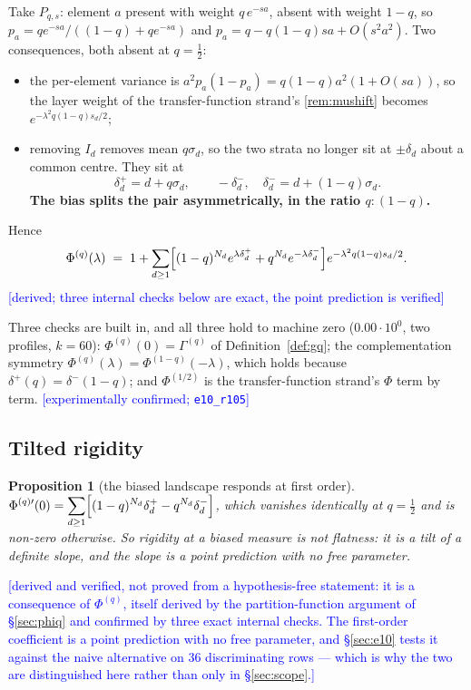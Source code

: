 \documentclass[11pt,a4paper]{article}
\theoremstyle{plain}
\newtheorem{proposition}[theorem]{Proposition}
\theoremstyle{definition}
\theoremstyle{remark}
\newcommand{\STATUS}[1]{\textcolor{blue}{\textsf{[#1]}}}
\begin{document}
Take $P_{q,s}$: element $a$ present with weight $q\,e^{-sa}$, absent with weight $1-q$, so
$p_a=q e^{-sa}/((1-q)+qe^{-sa})$ and $p_a=q-q(1-q)sa+O(s^2a^2)$. Two consequences, both
absent at $q=\tfrac12$:
\begin{itemize}
\item the per-element variance is $a^2p_a(1-p_a)=q(1-q)a^2(1+O(sa))$, so the layer weight of
      the transfer-function strand's \ref{rem:mushift} becomes $e^{-\lambda^2q(1-q)s_d/2}$;
\item removing $I_d$ removes mean $q\sigma_d$, so the two strata no longer sit at $\pm\delta_d$
      about a common centre. They sit at
      \[
        \delta^{+}_d=d+q\sigma_d,\qquad -\delta^{-}_d,\quad \delta^{-}_d=d+(1-q)\sigma_d .
      \]
      \textbf{The bias splits the pair asymmetrically, in the ratio $q:(1-q)$.}
\end{itemize}
Hence
\begin{equation}\label{eq:phiq}
  \Phi^{(q)}(\lambda)\;=\;1+\sum_{d\ge1}
  \Bigl[(1-q)^{N_d}e^{\lambda\delta^{+}_d}+q^{N_d}e^{-\lambda\delta^{-}_d}\Bigr]
  e^{-\lambda^{2}q(1-q)s_d/2}.
\end{equation}
\STATUS{derived; three internal checks below are exact, the point prediction is verified}

Three checks are built in, and all three hold to machine zero ($0.00\cdot10^{0}$, two
profiles, $k=60$): $\Phi^{(q)}(0)=\Gamma^{(q)}$ of Definition~\ref{def:gq}; the
complementation symmetry $\Phi^{(q)}(\lambda)=\Phi^{(1-q)}(-\lambda)$, which holds because
$\delta^{+}(q)=\delta^{-}(1-q)$; and $\Phi^{(1/2)}$ is the transfer-function strand's $\Phi$ term by term.
\STATUS{experimentally confirmed; \texttt{e10\_r105}}

\subsection{Tilted rigidity}

\begin{proposition}[the biased landscape responds at first order]\label{prop:tilted}
$\displaystyle \Phi^{(q)\prime}(0)=\sum_{d\ge1}\Bigl[(1-q)^{N_d}\delta^{+}_d-q^{N_d}\delta^{-}_d\Bigr]$,
which vanishes identically at $q=\tfrac12$ and is non-zero otherwise. So rigidity at a biased
measure is not flatness: it is a \emph{tilt} of a definite slope, and the slope is a point
prediction with no free parameter.
\end{proposition}

\STATUS{derived and verified, not proved from a hypothesis-free statement: it is a consequence
of $\Phi^{(q)}$, itself derived by the partition-function argument of \S\ref{sec:phiq} and
confirmed by three exact internal checks. The first-order coefficient is a point prediction
with no free parameter, and \S\ref{sec:e10} tests it against the naive alternative on $36$
discriminating rows --- which is why the two are distinguished here rather than only in
\S\ref{sec:scope}.}
\end{document}
